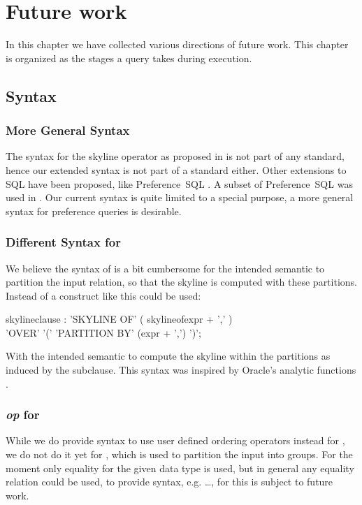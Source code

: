 


\chapter{Future work}
\label{chap:future-work}
In this chapter we have collected various directions of future work.
This chapter is organized as the stages a query takes during
execution.

\section{Syntax}
\subsection{More General Syntax}
The syntax for the skyline operator as proposed
in \citep{Borzsonyi2001} is not part of any standard, hence our
extended syntax is not part of a standard either.  Other extensions to
SQL have been proposed, like Preference~SQL \citep{Kiessling2002a}.  A
subset of Preference~SQL was used in \citep{Chaudhuri2006}.  Our
current syntax is quite limited to a special purpose, a more general
syntax for preference queries is desirable.

\subsection{Different Syntax for }
We believe the syntax of  is a bit
cumbersome for the intended semantic to partition the input relation,
so that the skyline is computed with these partitions. Instead
of  a construct like this could be used:

\begin{rail}
skylineclause : 
    'SKYLINE OF' ( skylineofexpr + ',' ) \\ 'OVER' '(' 'PARTITION BY' (expr + ',') ')';
\end{rail}

\noindent
With the intended semantic to compute the skyline within the
partitions as induced by the  subclause. This
syntax was inspired by Oracle's analytic functions \citep[Page~5-10]{Oracle2005}.


\subsection{ \emph{op} for }
While we do provide syntax to use user defined ordering operators
instead for , we do not do it yet for
, which is used to partition the input
into groups.  For the moment only equality for the given data type is
used, but in general any equality relation could be used, to provide
syntax, e.g. \dots {}, for this
is subject to future work.


